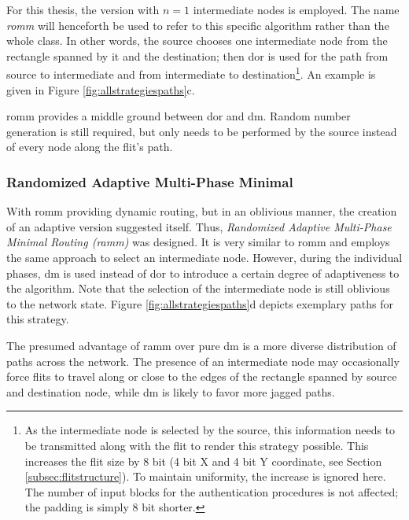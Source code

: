 For this thesis, the version with $n = 1$ intermediate nodes is employed. The name \textit{\gls{romm}} will henceforth be used to refer to this
specific algorithm rather than the whole class. In other words, the source chooses one intermediate node from the rectangle spanned by it and
the destination; then \gls{dor} is used for the path from source to intermediate and from intermediate to destination\footnote{As the intermediate
node is selected by the source, this information needs to be transmitted along with the flit to render this strategy possible. This increases the flit
size by 8 bit (4 bit X and 4 bit Y coordinate, see Section \ref{subsec:flitstructure}). To maintain uniformity, the increase is ignored here. The
number of input blocks for the authentication procedures is not affected; the padding is simply 8 bit shorter.}. An example is given in Figure
\ref{fig:allstrategiespaths}c.

\Gls{romm} provides a middle ground between \gls{dor} and \gls{dm}. Random number generation is still required, but only needs to be performed by the
source instead of every node along the flit's path.

\subsubsection{Randomized Adaptive Multi-Phase Minimal}\label{subsubsec:ramm}
With \gls{romm} providing dynamic routing, but in an oblivious manner, the creation of an adaptive version suggested itself. Thus, \textit{Randomized
Adaptive Multi-Phase Minimal Routing (\gls{ramm})} was designed. It is very similar to \gls{romm} and employs the same approach to select an
intermediate node. However, during the individual phases, \gls{dm} is used instead of \gls{dor} to introduce a certain degree of adaptiveness to the
algorithm. Note that the selection of the intermediate node is still oblivious to the network state. Figure \ref{fig:allstrategiespaths}d depicts
exemplary paths for this strategy.

The presumed advantage of \gls{ramm} over pure \gls{dm} is a more diverse distribution of paths across the network. The presence of an intermediate
node may occasionally force flits to travel along or close to the edges of the rectangle spanned by source and destination node, while \gls{dm} is
likely to favor more jagged paths.

